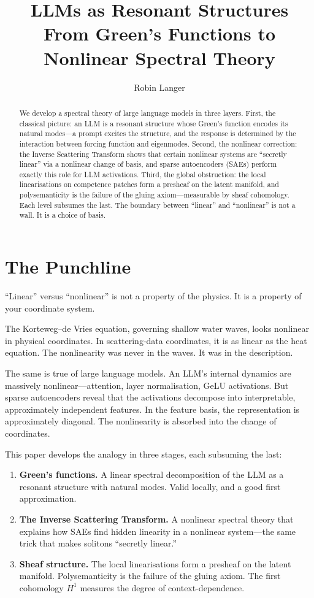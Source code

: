 \documentclass[11pt,a4paper]{article}
\title{\textbf{LLMs as Resonant Structures}\\[4pt]
\large From Green's Functions to Nonlinear Spectral Theory}
\author{Robin Langer}
\date{}
\begin{document}
\maketitle

\begin{abstract}
We develop a spectral theory of large language models in three layers. First,
the classical picture: an LLM is a resonant structure whose Green's function
encodes its natural modes---a prompt excites the structure, and the response is
determined by the interaction between forcing function and eigenmodes. Second,
the nonlinear correction: the Inverse Scattering Transform shows that certain
nonlinear systems are ``secretly linear'' via a nonlinear change of basis, and
sparse autoencoders (SAEs) perform exactly this role for LLM activations. Third,
the global obstruction: the local linearisations on competence patches form a
presheaf on the latent manifold, and polysemanticity is the failure of the
gluing axiom---measurable by sheaf cohomology. Each level subsumes the last.
The boundary between ``linear'' and ``nonlinear'' is not a wall. It is a choice
of basis.
\end{abstract}

\section{The Punchline}

``Linear'' versus ``nonlinear'' is not a property of the physics. It is a
property of your coordinate system.

The Korteweg--de Vries equation, governing shallow water waves, looks nonlinear
in physical coordinates. In scattering-data coordinates, it is as linear as the
heat equation. The nonlinearity was never in the waves. It was in the description.

The same is true of large language models. An LLM's internal dynamics are
massively nonlinear---attention, layer normalisation, GeLU activations. But
sparse autoencoders reveal that the activations decompose into interpretable,
approximately independent features. In the feature basis, the representation is
approximately diagonal. The nonlinearity is absorbed into the change of coordinates.

This paper develops the analogy in three stages, each subsuming the last:
\begin{enumerate}[leftmargin=*]
  \item \textbf{Green's functions.} A linear spectral decomposition of the LLM
    as a resonant structure with natural modes. Valid locally, and a good first
    approximation.
  \item \textbf{The Inverse Scattering Transform.} A nonlinear spectral theory
    that explains how SAEs find hidden linearity in a nonlinear system---the same
    trick that makes solitons ``secretly linear.''
  \item \textbf{Sheaf structure.} The local linearisations form a presheaf on
    the latent manifold. Polysemanticity is the failure of the gluing axiom.
    The first cohomology $H^1$ measures the degree of context-dependence.
\end{enumerate}
\end{document}
